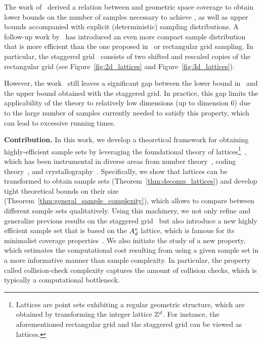 The work of~\citet{tsao2020sample} derived a relation between \decomps and geometric space coverage to obtain lower bounds on the number of samples necessary to achieve \decomps, as well as upper bounds accompanied with explicit (deterministic) sampling distributions. A follow-up work by~\citet{dayan2023near} has introduced an even more compact \decomp sample distribution that is more efficient than the one proposed in~\cite{tsao2020sample} or rectangular grid sampling. In particular, the staggered grid~\cite{dayan2023near} consists of two shifted and rescaled copies of the rectangular grid (see Figure~\ref{fig:2d_lattices} and Figure~\ref{fig:3d_lattices}). 

However, the work~\cite{dayan2023near} still leaves a significant gap between the lower bound in~\cite{tsao2020sample} and the upper bound obtained with the staggered grid. In practice, this gap limits the applicability of the \decomps theory to relatively low dimensions (up to dimension 6) due to the large number of samples currently needed to satisfy this property, which can lead to excessive running times. 

\vspace{5pt}
\noindent \textbf{Contribution.} In this work, we develop a theoretical framework for obtaining highly-efficient \decomp sample sets by leveraging the foundational theory of lattices\footnote{Lattices are point sets exhibiting a regular geometric structure, which are obtained by transforming the integer lattice $\mathbb{Z}^d$. For instance, the aforementioned rectangular grid and the staggered grid can be viewed as lattices.}~\cite{conway2013sphere}, which has been instrumental in diverse areas from number theory~\cite{siegel_geometry_numbers}, coding theory~\cite{ebeling2013lattices}, and crystallography~\cite{sands1994introduction}. Specifically, we show that lattices can be transformed to obtain \decomp sample sets (Theorem~\ref{thm:decomp_lattices}) and develop tight theoretical bounds on their size (Theorem~\ref{thm:general_sample_complexity}), which allows to compare between different sample sets qualitatively. 
Using this machinery, we not only refine and generalize previous results on the staggered grid~\cite{dayan2023near} but also introduce a new highly efficient \decomp sample set that is based on the $A_d^*$ lattice, which is famous for its minimalist coverage properties~\cite{conway2013sphere}. We also initiate the study of a new property, which estimates the computational cost resulting from using a given sample set in a more informative manner than sample complexity. In particular, the property called collision-check complexity captures the amount of collision checks, which is typically a computational bottleneck.

